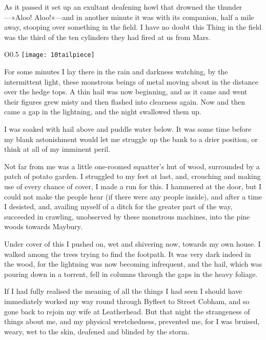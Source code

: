 As it passed it set up an exultant deafening howl that drowned the thunder—»Aloo! Aloo!«—and in another minute it was with its companion, half a mile away, stooping over something in the field. I have no doubt this Thing in the field was the third of the ten cylinders they had fired at us from Mars.

\begin{wrapfigure}{O}{0.5\textwidth}
\centering
\texttt{[image: 10tailpiece]}
\end{wrapfigure}

For some minutes I lay there in the rain and darkness watching, by the intermittent light, these monstrous beings of metal moving about in the distance over the hedge tops. A thin hail was now beginning, and as it came and went their figures grew misty and then flashed into clearness again. Now and then came a gap in the lightning, and the night swallowed them up.

I was soaked with hail above and puddle water below. It was some time before my blank astonishment would let me struggle up the bank to a drier position, or think at all of my imminent peril.

Not far from me was a little one-roomed squatter's hut of wood, surrounded by a patch of potato garden. I struggled to my feet at last, and, crouching and making use of every chance of cover, I made a run for this. I hammered at the door, but I could not make the people hear (if there were any people inside), and after a time I desisted, and, availing myself of a ditch for the greater part of the way, succeeded in crawling, unobserved by these monstrous machines, into the pine woods towards Maybury.

Under cover of this I pushed on, wet and shivering now, towards my own house. I walked among the trees trying to find the footpath. It was very dark indeed in the wood, for the lightning was now becoming infrequent, and the hail, which was pouring down in a torrent, fell in columns through the gaps in the heavy foliage.

If I had fully realised the meaning of all the things I had seen I should have immediately worked my way round through Byfleet to Street Cobham, and so gone back to rejoin my wife at Leatherhead. But that night the strangeness of things about me, and my physical wretchedness, prevented me, for I was bruised, weary, wet to the skin, deafened and blinded by the storm.



